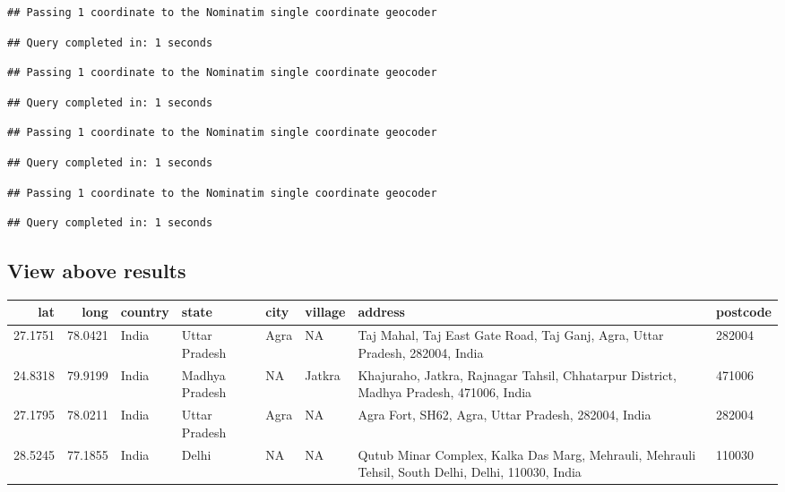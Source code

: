 \documentclass[
]{book}
\begin{document}
\begin{verbatim}
## Passing 1 coordinate to the Nominatim single coordinate geocoder
\end{verbatim}

\begin{verbatim}
## Query completed in: 1 seconds
\end{verbatim}

\begin{verbatim}
## Passing 1 coordinate to the Nominatim single coordinate geocoder
\end{verbatim}

\begin{verbatim}
## Query completed in: 1 seconds
\end{verbatim}

\begin{verbatim}
## Passing 1 coordinate to the Nominatim single coordinate geocoder
\end{verbatim}

\begin{verbatim}
## Query completed in: 1 seconds
\end{verbatim}

\begin{verbatim}
## Passing 1 coordinate to the Nominatim single coordinate geocoder
\end{verbatim}

\begin{verbatim}
## Query completed in: 1 seconds
\end{verbatim}

\hypertarget{view-above-results}{%
\subsection{View above results}\label{view-above-results}}

\begin{tabular}{r|r|l|l|l|l|l|l}
\hline
lat & long & country & state & city & village & address & postcode\\
\hline
27.1751 & 78.0421 & India & Uttar Pradesh & Agra & NA & Taj Mahal, Taj East Gate Road, Taj Ganj, Agra, Uttar Pradesh, 282004, India & 282004\\
\hline
24.8318 & 79.9199 & India & Madhya Pradesh & NA & Jatkra & Khajuraho, Jatkra, Rajnagar Tahsil, Chhatarpur District, Madhya Pradesh, 471006, India & 471006\\
\hline
27.1795 & 78.0211 & India & Uttar Pradesh & Agra & NA & Agra Fort, SH62, Agra, Uttar Pradesh, 282004, India & 282004\\
\hline
28.5245 & 77.1855 & India & Delhi & NA & NA & Qutub Minar Complex, Kalka Das Marg, Mehrauli, Mehrauli Tehsil, South Delhi, Delhi, 110030, India & 110030\\
\hline
\end{tabular}
\end{document}
